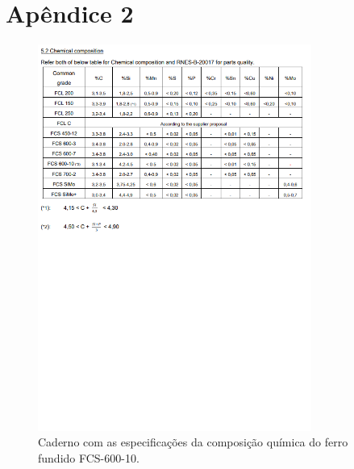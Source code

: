 \section{Apêndice 2}\label{ap:comp_quimica_caixa}
\begin{figure}[htpb]
    \centering
    \includegraphics[width=0.8\textwidth]{Figures/Apendix/Chemical_Comp_Caixa.png}
    \caption{Caderno com as especificações da composição química do ferro fundido FCS-600-10.}
    \label{fig:chemical_comp_caixa}
\end{figure}
\newpage
